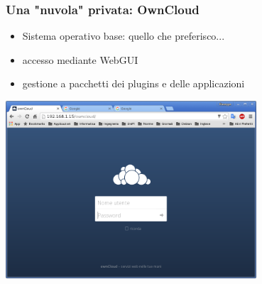 \documentclass[11pt,xcolor=table]{beamer}
\begin{document}
\begin{frame}
	\frametitle{Una "nuvola" privata: OwnCloud}
	\begin{itemize}
		\item Sistema operativo base: quello che preferisco...
		\item accesso mediante WebGUI
		\item gestione a pacchetti dei plugins e delle applicazioni
	\end{itemize}
	\centering
	\includegraphics[width=0.7\textwidth]{OC/OC1.png}
\end{frame}
\end{document}
